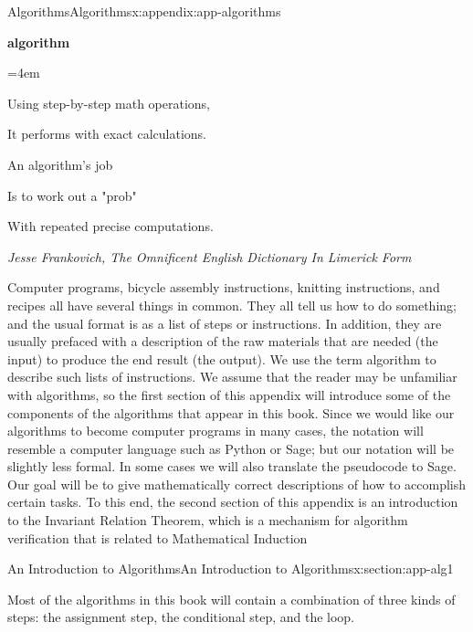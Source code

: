 \documentclass[oneside,10pt,]{book}
\numberwithin{equation}{section}
\newenvironment{poem}{\setlength{\parindent}{0em}}{}
\newcommand{\poemTitle}[1]{\begin{center}\large\textbf{#1}\end{center}}
\newenvironment{stanza}{\vspace{0.25 em}\hangindent=4em}{\vspace{1 em}}
\newcommand{\poemauthorleft}[1]{\vspace{-1em}\begin{flushleft}\textit{#1}\end{flushleft}}
\newcommand{\poemlineleft}[1]{{\raggedright{#1}\par}\vspace{-\parskip}}
\begin{document}
\begin{appendixptx}{Algorithms}{}{Algorithms}{}{}{x:appendix:app-algorithms}
\begin{introduction}{}%
\begin{poem}%
\poemTitle{algorithm}
\begin{stanza}
\poemlineleft{Using step-by-step math operations,}
\poemlineleft{It performs with exact calculations.}
\poemlineleft{An algorithm's job}
\poemlineleft{Is to work out a "prob"}
\poemlineleft{With repeated precise computations.}
\end{stanza}
\poemauthorleft{Jesse Frankovich, The Omnificent English Dictionary In Limerick Form}
\end{poem}
Computer programs, bicycle assembly instructions, knitting instructions, and recipes all have several things in common. They all tell us how to do something; and the usual format is as a list of steps or instructions. In addition, they are usually prefaced with a description of the raw materials that are needed (the input) to produce the end result (the output). We use the term algorithm to describe  such lists of instructions.   We assume that the reader may be unfamiliar with algorithms, so the first section of this appendix will introduce some of the components of the algorithms that appear in this book. Since we would like our algorithms to become computer programs in many cases, the notation will resemble a computer language such as Python or Sage; but our notation will be slightly less formal. In some cases we will also translate the pseudocode to Sage. Our goal will be to give mathematically correct descriptions of how to accomplish certain tasks.  To this end, the second section of this appendix is an introduction to the Invariant Relation Theorem, which is a mechanism for algorithm verification that is related to Mathematical Induction%
\end{introduction}%
%
%
\typeout{************************************************}
\typeout{************************************************}
%
\begin{sectionptx}{An Introduction to Algorithms}{}{An Introduction to Algorithms}{}{}{x:section:app-alg1}
\begin{introduction}{}%
Most of the algorithms in this book will contain a combination of three kinds of steps: the assignment step, the conditional step, and the loop.%
\end{introduction}%
%
%
\typeout{************************************************}

\end{sectionptx}
\end{appendixptx}
\end{document}
